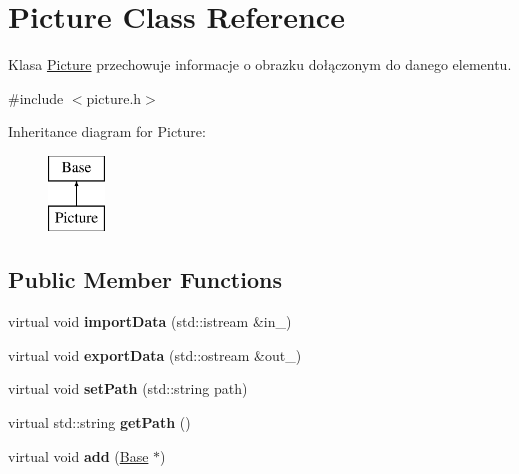 \hypertarget{class_picture}{}\section{Picture Class Reference}
\label{class_picture}


Klasa \mbox{\hyperlink{class_picture}{Picture}} przechowuje informacje o obrazku dołączonym do danego elementu.  




{\ttfamily \#include $<$picture.\+h$>$}

Inheritance diagram for Picture\+:\begin{figure}[H]
\begin{center}
\leavevmode
\includegraphics[height=2.000000cm]{class_picture}
\end{center}
\end{figure}
\subsection*{Public Member Functions}
\begin{DoxyCompactItemize}
\item 
\mbox{\label{class_picture_afaa06c0b911691026417379d5b78477d}} 
virtual void {\bfseries import\+Data} (std\+::istream \&in\+\_\+)
\item 
\mbox{\label{class_picture_a38c495d9851a7ebe12344d7b8e7075d5}} 
virtual void {\bfseries export\+Data} (std\+::ostream \&out\+\_\+)
\item 
\mbox{\label{class_picture_a8826800da424208a9475242817c2d050}} 
virtual void {\bfseries set\+Path} (std\+::string path)
\item 
\mbox{\label{class_picture_ac9f36933f7bf3ac9e40684891b2129bb}} 
virtual std\+::string {\bfseries get\+Path} ()
\item 
\mbox{\label{class_picture_a128bb0b00a4d0b0685bedb00160e3991}} 
virtual void {\bfseries add} (\mbox{\hyperlink{class_base}{Base}} $\ast$)
\end{DoxyCompactItemize}
